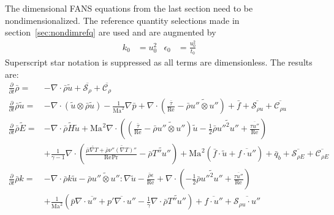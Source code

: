 \documentclass[letterpaper,11pt,nointlimits,reqno,draft]{amsbook}
\newcommand{\Mach}[1][]{\ensuremath{\mbox{Ma}_{#1}}}
\newcommand{\Reynolds}[1][]{\ensuremath{\mbox{Re}_{#1}}}
\newcommand{\Prandtl}[1][]{\ensuremath{\mbox{Pr}_{#1}}}
\newcommand{\Ssd}{\ensuremath{\mathcal{S}}} %
\newcommand{\Cs}{\ensuremath{\mathcal{C}}}  %
\begin{document}
The dimensional FANS equations from the last section need to be
nondimensionalized.   The reference quantity selections made in
section~\ref{sec:nondimrefq} are used and are augmented by
\begin{align}
  k_0 &= u_{0}^2
&
  \epsilon_0 &= \frac{u_{0}^2}{t_0}
\end{align}
Superscript star notation is suppressed as all terms
are dimensionless.  The results are:
\begin{subequations}
\begin{align}
    \frac{\partial}{\partial{}t}\bar{\rho}
=
 &- \nabla\cdot\bar{\rho}\tilde{u}
  + \overline{\Ssd_{\rho{}}}
  + \overline{\Cs_{\rho{}}}
\\
    \frac{\partial{}}{\partial{}t}\bar{\rho}\tilde{u}
=
 &- \nabla\cdot(\tilde{u}\otimes\bar{\rho}\tilde{u})
  - \frac{1}{\Mach^2}\nabla{}\bar{p}
  + \nabla\cdot\left(
        \frac{\bar{\tau}}{\Reynolds}
      - \bar{\rho} \widetilde{u''\otimes{}u''}
    \right)
  + \bar{f}
  + \overline{\Ssd_{\rho{} u}}
  + \overline{\Cs_{\rho{} u}}
\\
  \frac{\partial}{\partial{}t} \bar{\rho}\tilde{E}
=
 &- \nabla\cdot\bar{\rho}\tilde{H}\tilde{u}
  + \Mach^{2} \nabla\cdot\left(
        \left(
            \frac{\bar{\tau}}{\Reynolds}
          - \bar{\rho} \widetilde{u''\otimes{}u''}
        \right) \tilde{u}
      - \frac{1}{2}\bar{\rho}\widetilde{{u''}^{2}u''}
      + \frac{\overline{\tau{}u''}}{\Reynolds}
    \right)
\\
 &+ \frac{1}{\gamma-1} \nabla\cdot\left(
      \frac{
         \bar{\mu} \widetilde{\nabla{}T}
       + \bar{\rho} \widetilde{\nu'' \left(\nabla{}T\right)''}
      }{\Reynolds\Prandtl}
      - \bar{\rho} \widetilde{T''u''}
    \right)
  + \Mach^{2} \left(
        \bar{f}\cdot\tilde{u}
      + \overline{f\cdot{}u''}
    \right)
  + \bar{q}_b
  + \overline{\Ssd_{\rho{} E}}
  + \overline{\Cs_{\rho{} E}}
\\
    \frac{\partial{}}{\partial{}t}\bar{\rho}k
=
 &- \nabla\cdot\bar{\rho}k\tilde{u}
  - \bar{\rho} \widetilde{u''\otimes{}u''} : \nabla\tilde{u}
  - \frac{\bar{\rho} \epsilon}{\Reynolds}
  + \nabla\cdot\left(
        -\frac{1}{2}\bar{\rho} \widetilde{{u''}^{2}u''}
      + \frac{\overline{\tau{}u''}}{\Reynolds}
    \right)
\\
 &+ \frac{1}{\Mach^2} \left(
        \bar{p}\nabla\cdot\overline{u''}
      + \overline{p' \nabla\cdot{}u''}
      - \frac{1}{\gamma} \nabla\cdot\bar{\rho} \widetilde{T''u''}
    \right)
  + \overline{f\cdot{}u''}
  + \overline{\Ssd_{\rho{} u}\cdot{}u''}

\end{align}
\end{subequations}
\end{document}
